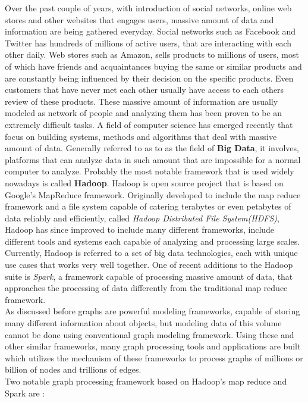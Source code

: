 \documentclass[english]{tktltiki}
\begin{document}
Over the past couple of years, with introduction of social networks, online web stores and other websites that engages users, massive amount of data and information are being gathered everyday. Social networks such as Facebook and Twitter has hundreds of millions of active users, that are interacting with each other daily. Web stores such as Amazon, sells products to millions of users, most of which have friends and acquaintances buying the same or similar products and are constantly being influenced by their decision on the specific products. Even customers that have never met each other usually have access to each others review of these products. These massive amount of information are usually modeled as network of people and analyzing them  has been proven to be an extremely difficult tasks. A field of computer science has emerged recently that focus on building systems, methods and algorithms that deal with massive amount of data. Generally referred to as to as the field of \textbf{Big Data}, it involves, platforms that can analyze data in such amount that are impossible for a normal computer to analyze. Probably the most notable framework that is used widely nowadays is called \textbf{Hadoop}. Hadoop is open source project that is based on Google's MapReduce framework. Originally developed to include the map reduce framework and a file system capable of catering terabytes or even petabytes of data reliably and efficiently, called \textit{Hadoop Distributed File System(HDFS)}, Hadoop has since improved to include many different frameworks, include different tools and systems each capable of analyzing and processing large scales. Currently, Hadoop is referred to a set of big data technologies, each with unique use cases that works very well together. One of recent additions to the Hadoop suite is \textit{Spark}, a framework capable of processing massive amount of data, that approaches the processing of data differently from the traditional map reduce framework. \\
As discussed before graphs are powerful modeling frameworks, capable of storing many different information about objects, but modeling data of this volume cannot be done using conventional graph modeling framework. Using these and other similar frameworks, many graph processing tools and applications are built which utilizes the mechanism of these frameworks to process graphs of millions or billion of nodes and trillions of edges. \\
Two notable graph processing framework based on Hadoop's map reduce and Spark are :
\end{document}

